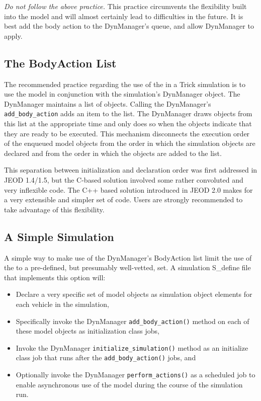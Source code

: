 {\em Do not follow the above practice.} This practice circumvents the
flexibility built into the model and will almost certainly lead to
difficulties in the future. It is best add the body action to the DynManager's
queue, and allow DynManager to apply.

\subsection*{The BodyAction List}

The recommended practice regarding the use of the \ModelDesc in a
Trick simulation is to use the model in conjunction with the
simulation's DynManager object. The DynManager maintains a list
of \ModelDesc objects. Calling the DynManager's {\tt add\_body\_action}
adds an item to the list. The DynManager draws objects from this list
at the appropriate time and only does so when the objects indicate
that they are ready to be executed. This mechanism disconnects the
execution order of the enqueued model objects from the order in
which the simulation objects are declared and from the order
in which the objects are added to the list.

This separation between initialization and declaration order
was first addressed in JEOD 1.4/1.5, but the C-based solution
involved some rather convoluted and very inflexible code.
The C++ based solution introduced in JEOD 2.0 makes for
a very extensible and simpler set of code. Users are strongly
recommended to take advantage of this flexibility.

\subsection*{A Simple Simulation}
A simple way to make use of the DynManager's BodyAction list
limit the use of the \ModelDesc to a pre-defined,
but presumably well-vetted, set.
A simulation S\_define file that implements this option will:
\begin{itemize}
\item Declare a very specific set of model objects as simulation
object elements for each vehicle in the simulation,
\item Specifically invoke the DynManager {\tt add\_body\_action()}
method on each of these model objects as initialization class jobs,
\item Invoke the DynManager {\tt initialize\_simulation()} method
as an initialize class job that runs after the {\tt add\_body\_action()}
jobs, and
\item Optionally invoke the DynManager {\tt perform\_actions()}
as a scheduled job to enable asynchronous use of the model during
the course of the simulation run.
\end{itemize}

